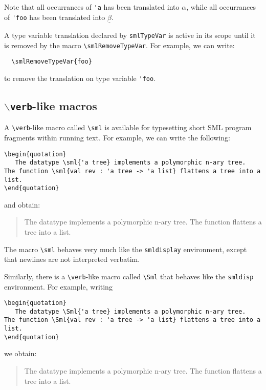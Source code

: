 \documentclass{article}
\begin{document}
Note that all occurrances of \verb|'a| has been translated into
$\alpha$, while all occurrances of \verb|'foo| has been translated
into $\underline\beta$.

A type variable translation declared by \verb|smlTypeVar| is active
in its scope until it is removed by 
the macro \verb|\smlRemoveTypeVar|.
For example, we can write:
\begin{verbatim}
  \smlRemoveTypeVar{foo}
\end{verbatim}
to remove the translation on type variable \verb|'foo|.


\subsection{{\tt $\backslash${verb}}-like macros}
A \verb|\verb|-like macro called \verb|\sml| is available for typesetting
short SML program fragments within running text.  
For example, we can write the following:
\begin{verbatim}
\begin{quotation}
   The datatype \sml{'a tree} implements a polymorphic n-ary tree.
The function \sml{val rev : 'a tree -> 'a list} flattens a tree into a list.
\end{quotation}
\end{verbatim}
and obtain:
\begin{quotation}
   The datatype  implements a polymorphic n-ary tree.
The function  flattens a tree into a list.
\end{quotation}
The macro \verb|\sml| behaves very much like the \verb|smldisplay|
environment, except that newlines are not interpreted verbatim.

Similarly, there is a \verb|\verb|-like macro called \verb|\Sml| that
behaves like the \verb|smldisp| environment.  For example, writing
\begin{verbatim}
\begin{quotation}
   The datatype \Sml{'a tree} implements a polymorphic n-ary tree.
The function \Sml{val rev : 'a tree -> 'a list} flattens a tree into a list.
\end{quotation}
\end{verbatim}
we obtain:
\begin{quotation}
   The datatype  implements a polymorphic n-ary tree.
The function  flattens a tree into a list.
\end{quotation}
\end{document}
